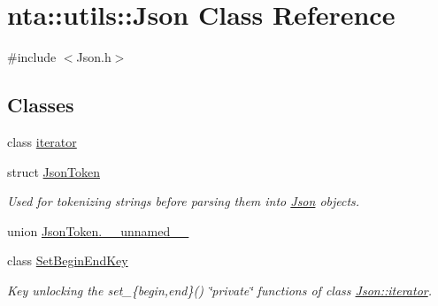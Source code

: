 \hypertarget{classnta_1_1utils_1_1Json}{}\section{nta\+:\+:utils\+:\+:Json Class Reference}
\label{classnta_1_1utils_1_1Json}


{\ttfamily \#include $<$Json.\+h$>$}

\subsection*{Classes}
\begin{DoxyCompactItemize}
\item 
class \hyperlink{classnta_1_1utils_1_1Json_1_1iterator}{iterator}
\item 
struct \hyperlink{structnta_1_1utils_1_1Json_1_1JsonToken}{Json\+Token}
\begin{DoxyCompactList}\small\item\em Used for tokenizing strings before parsing them into \hyperlink{classnta_1_1utils_1_1Json}{Json} objects. \end{DoxyCompactList}\item 
union \hyperlink{classnta_1_1utils_1_1Json_d6/d05/unionnta_1_1utils_1_1Json_1_1JsonToken_8____unnamed____}{Json\+Token.\+\_\+\+\_\+unnamed\+\_\+\+\_\+}
\item 
class \hyperlink{classnta_1_1utils_1_1Json_1_1SetBeginEndKey}{Set\+Begin\+End\+Key}
\begin{DoxyCompactList}\small\item\em Key unlocking the set\+\_\+\{begin,end\}() \char`\"{}private\char`\"{} functions of class \hyperlink{classnta_1_1utils_1_1Json_1_1iterator}{Json\+::iterator}. \end{DoxyCompactList}\end{DoxyCompactItemize}
